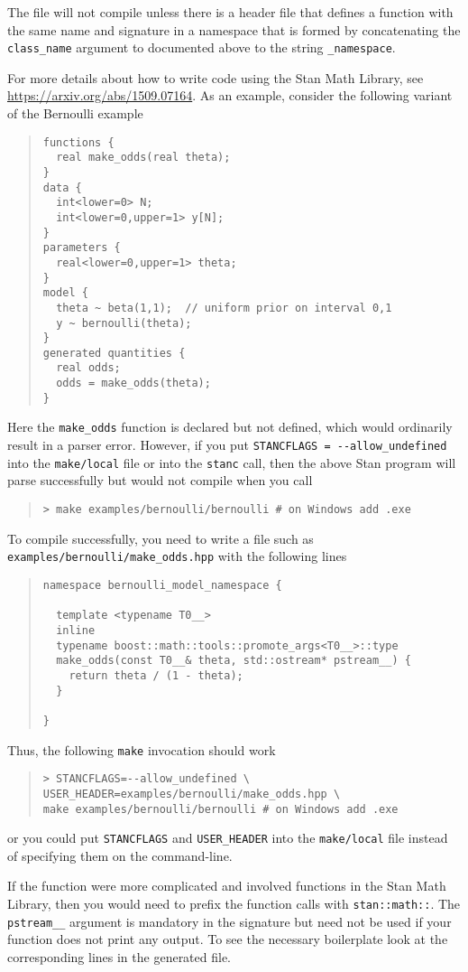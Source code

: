The \Cpp file will not compile unless there is a header file that
defines a function with the same name and signature in a namespace
that is formed by concatenating the {\tt class\_name} argument to
\stanc documented above to the string {\tt \_namespace}.

For more details about how to write \Cpp code using the Stan Math
Library, see \url{https://arxiv.org/abs/1509.07164}. As an example,
consider the following variant of the Bernoulli example
%
\begin{quote}
\begin{Verbatim}
functions {
  real make_odds(real theta);
}
data {
  int<lower=0> N;
  int<lower=0,upper=1> y[N];
}
parameters {
  real<lower=0,upper=1> theta;
}
model {
  theta ~ beta(1,1);  // uniform prior on interval 0,1
  y ~ bernoulli(theta);
}
generated quantities {
  real odds;
  odds = make_odds(theta);
}
\end{Verbatim}
\end{quote}
%
Here the {\tt make\_odds} function is declared but not defined,
which would ordinarily result in a parser error. However, if you
put \Verb|STANCFLAGS = --allow_undefined| into the
{\tt make/local} file or into the {\tt stanc} call, then the above 
Stan program will parse successfully but would not compile when you 
call
%
\begin{quote}
\begin{Verbatim}[fontshape=sl]
> make examples/bernoulli/bernoulli # on Windows add .exe 
\end{Verbatim}
\end{quote}
%
To compile successfully, you need to write a file such as {\tt
examples/bernoulli/make\_odds.hpp} with the following lines
%
\begin{quote}
\begin{Verbatim}
namespace bernoulli_model_namespace {

  template <typename T0__>
  inline
  typename boost::math::tools::promote_args<T0__>::type
  make_odds(const T0__& theta, std::ostream* pstream__) {
    return theta / (1 - theta);
  }

}
\end{Verbatim}
\end{quote}
%
Thus, the following {\tt make} invocation should work
%
\begin{quote}
\begin{Verbatim}[fontshape=sl]
> STANCFLAGS=--allow_undefined \
USER_HEADER=examples/bernoulli/make_odds.hpp \
make examples/bernoulli/bernoulli # on Windows add .exe 
\end{Verbatim}
\end{quote}
%
or you could put \Verb|STANCFLAGS| and \Verb|USER_HEADER|
into the {\tt make/local} file instead of specifying them
on the command-line.

If the function were more complicated and involved functions
in the Stan Math Library, then you would need to prefix the
function calls with {\tt stan::math::}. The {\tt pstream\_\_}
argument is mandatory in the signature but need not be used
if your function does not print any output. To see the 
necessary boilerplate look at the corresponding lines in the
generated \Cpp file.
